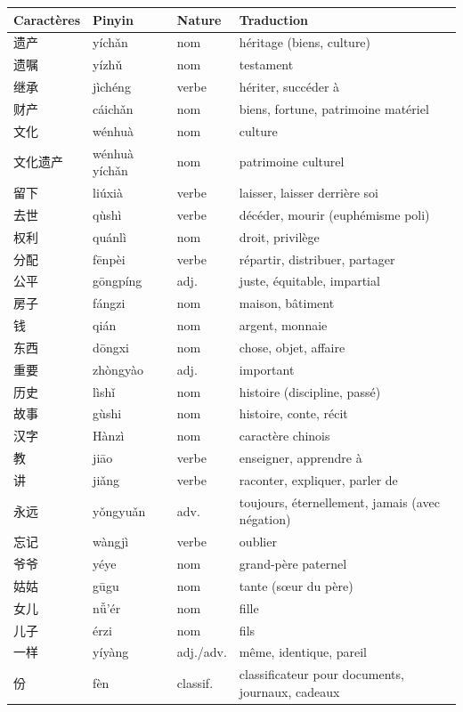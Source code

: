 \documentclass[11pt]{article}
\begin{document}
\begin{center}
\begin{tabularx}{\linewidth}{|X|X|X|X|}
\hline
\rowcolor{popblueL} Caractères & Pinyin & Nature & Traduction \\
\hline
遗产 & yíchǎn & nom & héritage (biens, culture) \\
\hline
遗嘱 & yízhǔ & nom & testament \\
\hline
继承 & jìchéng & verbe & hériter, succéder à \\
\hline
财产 & cáichǎn & nom & biens, fortune, patrimoine matériel \\
\hline
文化 & wénhuà & nom & culture \\
\hline
文化遗产 & wénhuà yíchǎn & nom & patrimoine culturel \\
\hline
留下 & liúxià & verbe & laisser, laisser derrière soi \\
\hline
去世 & qùshì & verbe & décéder, mourir (euphémisme poli) \\
\hline
权利 & quánlì & nom & droit, privilège \\
\hline
分配 & fēnpèi & verbe & répartir, distribuer, partager \\
\hline
公平 & gōngpíng & adj. & juste, équitable, impartial \\
\hline
房子 & fángzi & nom & maison, bâtiment \\
\hline
钱 & qián & nom & argent, monnaie \\
\hline
东西 & dōngxi & nom & chose, objet, affaire \\
\hline
重要 & zhòngyào & adj. & important \\
\hline
历史 & lìshǐ & nom & histoire (discipline, passé) \\
\hline
故事 & gùshi & nom & histoire, conte, récit \\
\hline
汉字 & Hànzì & nom & caractère chinois \\
\hline
教 & jiāo & verbe & enseigner, apprendre à \\
\hline
讲 & jiǎng & verbe & raconter, expliquer, parler de \\
\hline
永远 & yǒngyuǎn & adv. & toujours, éternellement, jamais (avec négation) \\
\hline
忘记 & wàngjì & verbe & oublier \\
\hline
爷爷 & yéye & nom & grand-père paternel \\
\hline
姑姑 & gūgu & nom & tante (sœur du père) \\
\hline
女儿 & nǚ'ér & nom & fille \\
\hline
儿子 & érzi & nom & fils \\
\hline
一样 & yíyàng & adj./adv. & même, identique, pareil \\
\hline
份 & fèn & classif. & classificateur pour documents, journaux, cadeaux \\
\hline
\end{tabularx}
\end{center}
\end{document}
